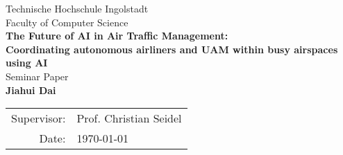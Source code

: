 \begin{titlepage}
    \centering
    {\LARGE Technische Hochschule Ingolstadt}\\[1.5cm]
    {\Large Faculty of Computer Science}\\[3cm]

    {\huge \textbf{
        The Future of AI in Air Traffic Management: \\ [0.5em]
        Coordinating autonomous airliners and UAM within busy airspaces using AI
    }
    }\\[0.5cm]

    {\Large Seminar Paper}\\[2cm]

    {\Large \textbf{Jiahui Dai}}\\[3cm]

    \begin{tabular}{rl}
        Supervisor: & Prof. Christian Seidel \\
        Date: & \today
    \end{tabular}

    \vfill
\end{titlepage}
